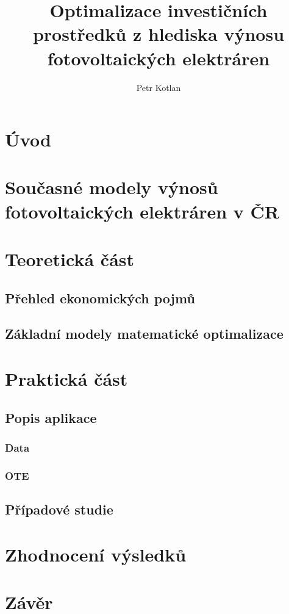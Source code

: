 \documentclass[a4paper, 12pt]{report}
\author{Petr Kotlan}
\title{Optimalizace investičních prostředků z hlediska
výnosu fotovoltaických elektráren}
\date{}
\begin{document}

\tableofcontents

\pagebreak

\chapter{Úvod}

\chapter{Současné modely výnosů fotovoltaických elektráren v ČR}

\chapter{Teoretická část}

\section{Přehled ekonomických pojmů}

\section{Základní modely matematické optimalizace}

\chapter{Praktická část}

\section{Popis aplikace}

\subsection{Data}

\subsection*{OTE}


\section{Případové studie}

\chapter{Zhodnocení výsledků}

\chapter{Závěr}
\end{document}
